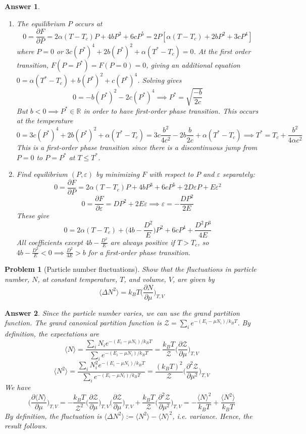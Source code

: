 \documentclass[a4paper]{article}
\theoremstyle{new2}
\newtheorem{ans}{Answer}[section]
\theoremstyle{new}
\newtheorem{qns}{Problem}[section]
\begin{document}
\begin{ans}\leavevmode
\begin{enumerate}[label=(\roman*)]
\item The equilibrium $P$ occurs at
$$0=\frac{\partial F}{\partial P}=2\alpha(T-T_c)P+4bP^3+6cP^5=2P[\alpha(T-T_c)+2bP^2+3cP^4]$$
where $P=0$ or $3c(P^*)^4+2b(P^*)^2+\alpha(T^*-T_c)=0$. At the first order transition, $F(P=P^*)=F(P=0)=0$, giving an additional equation $0=\alpha(T^*-T_c)+b(P^*)^2+c(P^*)^4$. Solving gives
$$0=-b(P^*)^2-2c(P^*)^4\implies P^*=\sqrt{\frac{-b}{2c}}$$
But $b<0\implies P^*\in\mathbb{R}$ in order to have first-order phase transition. This occurs at the temperature
$$0=3c(P^*)^4+2b(P^*)^2+\alpha(T^*-T_c)=3c\frac{b^2}{4c^2}-2b\frac{b}{2c}+\alpha(T^*-T_c)\implies T^*=T_c+\frac{b^2}{4\alpha c^2}$$
This is a first-order phase transition since there is a discontinuous jump from $P=0$ to $P=P^*$ at $T\leq T^*$.
\item Find equilibrium $(P,\varepsilon)$ by minimizing $F$ with respect to $P$ and $\varepsilon$ separately:
$$0=\frac{\partial F}{\partial P}=2\alpha(T-T_c)P+4bP^3+6cP^5+2D\varepsilon P+E\varepsilon^2$$
$$0=\frac{\partial F}{\partial\varepsilon}=DP^2+2E\varepsilon\implies\varepsilon=-\frac{DP^2}{2E}$$
These give
$$0=2\alpha(T-T_c)+\bigg(4b-\frac{D^2}{E}\bigg)P^2+6cP^4+\frac{D^2P^3}{4E}$$
All coefficients except $4b-\frac{D^2}{E}$ are always positive if $T>T_c$, so $4b-\frac{D^2}{E}<0\implies\frac{D^2}{4E}>b$ for a first-order phase transition.
\end{enumerate}
\end{ans}
\newpage
\begin{qns}[Particle number fluctuations]
Show that the fluctuations in particle number, $N$, at constant temperature, $T$, and volume, $V$, are given by 
$$\langle\Delta N^2\rangle=k_BT\bigg(\frac{\partial N}{\partial\mu}\bigg)_{T,V}$$
\end{qns}
\begin{ans}
Since the particle number varies, we can use the grand partition function. The grand canonical partition function is $\mathcal{Z}=\sum_ie^{-(E_i-\mu N_i)/k_BT}$. By definition, the expectations are
$$\langle N\rangle=\frac{\sum_iN_ie^{-(E_i-\mu N_i)/k_BT}}{\sum_ie^{-(E_i-\mu N_i)/k_BT}}=\frac{k_BT}{\mathcal{Z}}\bigg(\frac{\partial\mathcal{Z}}{\partial\mu}\bigg)_{T,V}$$
$$\langle N^2\rangle=\frac{\sum_iN_i^2e^{-(E_i-\mu N_i)/k_BT}}{\sum_ie^{-(E_i-\mu N_i)/k_BT}}=\frac{(k_BT)^2}{\mathcal{Z}}\bigg(\frac{\partial^2\mathcal{Z}}{\partial\mu^2}\bigg)_{T,V}$$
We have
$$\bigg(\frac{\partial\langle N\rangle}{\partial\mu}\bigg)_{T,V}=-\frac{k_BT}{\mathcal{Z}^2}\bigg(\frac{\partial\mathcal{Z}}{\partial\mu}\bigg)_{T,V}\bigg(\frac{\partial\mathcal{Z}}{\partial\mu}\bigg)_{T,V}+\frac{k_BT}{\mathcal{Z}}\bigg(\frac{\partial^2\mathcal{Z}}{\partial\mu^2}\bigg)_{T,V}=-\frac{\langle N\rangle^2}{k_BT}+\frac{\langle N^2\rangle}{k_BT}$$
By definition, the fluctuation is $\langle\Delta N^2\rangle:=\langle N^2\rangle-\langle N\rangle^2$, i.e. variance. Hence, the result follows.
\end{ans}
\end{document}
